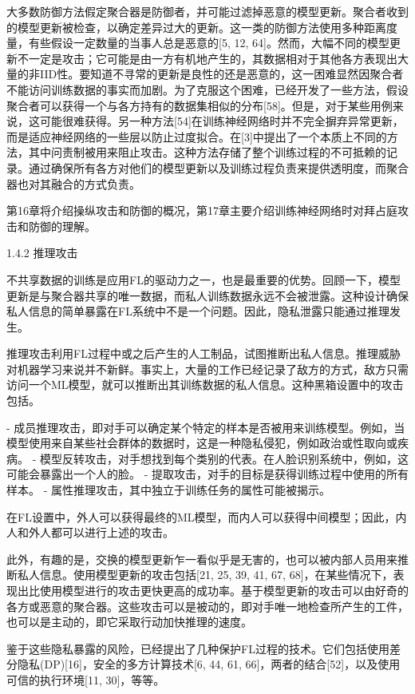 大多数防御方法假定聚合器是防御者，并可能过滤掉恶意的模型更新。聚合者收到的模型更新被检查，以确定差异过大的更新。这一类的防御方法使用多种距离度量，有些假设一定数量的当事人总是恶意的[5, 12, 64]。然而，大幅不同的模型更新不一定是攻击；它可能是由一方有机地产生的，其数据相对于其他各方表现出大量的非IID性。要知道不寻常的更新是良性的还是恶意的，这一困难显然因聚合者不能访问训练数据的事实而加剧。为了克服这个困难，已经开发了一些方法，假设聚合者可以获得一个与各方持有的数据集相似的分布[58]。但是，对于某些用例来说，这可能很难获得。另一种方法[54]在训练神经网络时并不完全摒弃异常更新，而是适应神经网络的一些层以防止过度拟合。在[3]中提出了一个本质上不同的方法，其中问责制被用来阻止攻击。这种方法存储了整个训练过程的不可抵赖的记录。通过确保所有各方对他们的模型更新以及训练过程负责来提供透明度，而聚合器也对其融合的方式负责。

第16章将介绍操纵攻击和防御的概况，第17章主要介绍训练神经网络时对拜占庭攻击和防御的理解。

1.4.2 推理攻击

不共享数据的训练是应用FL的驱动力之一，也是最重要的优势。回顾一下，模型更新是与聚合器共享的唯一数据，而私人训练数据永远不会被泄露。这种设计确保私人信息的简单暴露在FL系统中不是一个问题。因此，隐私泄露只能通过推理发生。

推理攻击利用FL过程中或之后产生的人工制品，试图推断出私人信息。推理威胁对机器学习来说并不新鲜。事实上，大量的工作已经记录了敌方的方式，敌方只需访问一个ML模型，就可以推断出其训练数据的私人信息。这种黑箱设置中的攻击包括。

- 成员推理攻击，即对手可以确定某个特定的样本是否被用来训练模型。例如，当模型使用来自某些社会群体的数据时，这是一种隐私侵犯，例如政治或性取向或疾病。
- 模型反转攻击，对手想找到每个类别的代表。在人脸识别系统中，例如，这可能会暴露出一个人的脸。
- 提取攻击，对手的目标是获得训练过程中使用的所有样本。
- 属性推理攻击，其中独立于训练任务的属性可能被揭示。

在FL设置中，外人可以获得最终的ML模型，而内人可以获得中间模型；因此，内人和外人都可以进行上述的攻击。

此外，有趣的是，交换的模型更新乍一看似乎是无害的，也可以被内部人员用来推断私人信息。使用模型更新的攻击包括[21, 25, 39, 41, 67, 68]，在某些情况下，表现出比使用模型进行的攻击更快更高的成功率。基于模型更新的攻击可以由好奇的各方或恶意的聚合器。这些攻击可以是被动的，即对手唯一地检查所产生的工件，也可以是主动的，即它采取行动加快推理的速度。

鉴于这些隐私暴露的风险，已经提出了几种保护FL过程的技术。它们包括使用差分隐私(DP)[16]，安全的多方计算技术[6, 44, 61, 66]，两者的结合[52]，以及使用可信的执行环境[11, 30]，等等。

